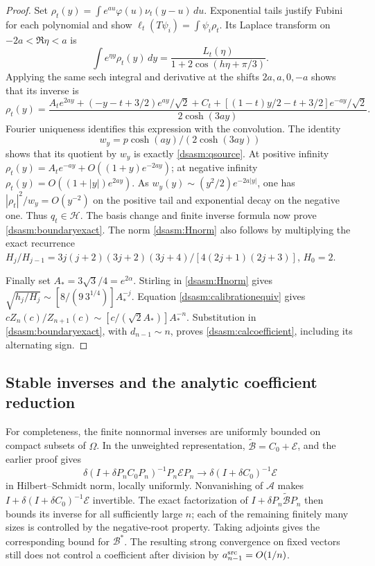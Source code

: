 \documentclass[11pt,letterpaper]{article}
\theoremstyle{remark}\newtheorem{remark}[theorem]{Remark}
\begin{document}
\begin{proof}
Set
$\rho_t(y)=\int e^{au}\varphi(u)\nu_t(y-u)\,du$.
Exponential tails justify Fubini for each polynomial and show
$\ell_t(T\psi_i)=\int\psi_i\rho_t$.
Its Laplace transform on $-2a<\Re\eta<a$ is
\[
 \int e^{\eta y}\rho_t(y)\,dy
   =\frac{L_t(\eta)}{1+2\cos(h\eta+\pi/3)}.
\]
Applying the same sech integral and derivative at the shifts
$2a,a,0,-a$ shows that its inverse is
\begin{equation}\label{dsasm:rhosource}
 \rho_t(y)=\frac{A_te^{2ay}+(-y-t+3/2)e^{ay}/\sqrt2+C_t
                +[(1-t)y/2-t+3/2]e^{-ay}/\sqrt2}{2\cosh(3ay)}.
\end{equation}
Fourier uniqueness identifies this expression with the convolution.
The identity
\[w_y=p\cosh(ay)/(2\cosh(3ay))\]
shows that its quotient by $w_y$ is
exactly \eqref{dsasm:qsource}. At positive infinity
$\rho_t(y)=A_te^{-ay}+O((1+y)e^{-2ay})$; at negative infinity
$\rho_t(y)=O((1+|y|)e^{2ay})$. As
$w_y(y)\sim(y^2/2)e^{-2a|y|}$, one has
$|\rho_t|^2/w_y=O(y^{-2})$ on the positive tail and exponential
decay on the negative one. Thus $q_t\in\mathcal H$.
The basis change and finite inverse formula now prove
\eqref{dsasm:boundaryexact}. The norm \eqref{dsasm:Hnorm} also follows by multiplying
the exact recurrence
$H_j/H_{j-1}=3j(j+2)(3j+2)(3j+4)/[4(2j+1)(2j+3)]$, $H_0=2$.

Finally set $A_*=3\sqrt3/4=e^{2\alpha}$. Stirling in \eqref{dsasm:Hnorm}
gives
$\sqrt{h_j/H_j}\sim [8/(9\,3^{1/4})]A_*^{-j}$.
Equation \eqref{dsasm:calibrationequiv} gives
$cZ_n(c)/Z_{n+1}(c)\sim[c/(\sqrt2 A_*)]A_*^{-n}$.
Substitution in \eqref{dsasm:boundaryexact}, with $d_{n-1}\sim n$,
proves \eqref{dsasm:calcoefficient}, including its alternating sign.
\end{proof}

\subsection{Stable inverses and the analytic coefficient reduction}
For completeness, the finite nonnormal inverses are uniformly bounded
on compact subsets of $\Omega$. In the unweighted representation,
$\widetilde{\mathcal B}=C_0+\mathcal E$, and the earlier proof gives
\[
 \delta(I+\delta P_nC_0P_n)^{-1}P_n\mathcal EP_n
 \longrightarrow\delta(I+\delta C_0)^{-1}\mathcal E
\]
in Hilbert--Schmidt norm, locally uniformly. Nonvanishing of
$\mathcal A$ makes $I+\delta(I+\delta C_0)^{-1}\mathcal E$
invertible. The exact factorization of $I+\delta P_n\widetilde{\mathcal B}P_n$
then bounds its inverse for all sufficiently large $n$; each of the
remaining finitely many sizes is controlled by the negative-root
property. Taking adjoints gives the corresponding bound for
$\mathcal B^*$. The resulting strong convergence on fixed vectors
still does not control a coefficient after division by
$a_{n-1}^{\rm src}=O(1/n)$.
\end{document}
